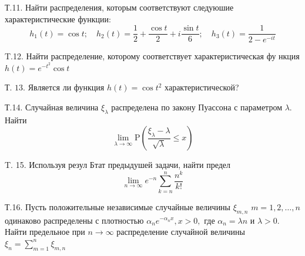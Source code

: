 \documentclass[a4paper,12pt]{article} %
\begin{document}
\begin{example}

Т.11. Найти распределения, которым соответствуют следуюшие характеристические функции:
$$
h_{1}(t)=\cos t ; \quad h_{2}(t)=\frac{1}{2}+\frac{\cos t}{2}+i \frac{\sin t}{6} ; \quad h_{3}(t)=\frac{1}{2-e^{-i t}}
$$




\end{example}





\begin{example}


T.12. Найти распределение, которому соответствует характеристическая фу нкция $h(t)=e^{-t^{2}} \cos t$



\end{example}







\begin{example}

Т. $13 .$ Является ли функция $h(t)=\cos t^{2}$ характеристической?




\end{example}



\begin{example}

Т.14. Случайная величина $\xi_{\lambda}$ распределена по закону Пуассона с параметром $\lambda .$ Найти
$$
\lim _{\lambda \rightarrow \infty} \mathrm{P}\left(\frac{\xi_{\lambda}-\lambda}{\sqrt{\lambda}} \leqslant x\right)
$$




\end{example}



\begin{example}

T. 15. Используя резул Бтат предыдушей задачи, найти предел
$$
\lim _{n \rightarrow \infty} e^{-n} \sum_{k=n}^{n} \frac{n^{k}}{k !}
$$




\end{example}





\begin{example}

Т.16. Пусть положительные независимые случайные величины $\xi_{m, n}$ $m=1,2, \ldots, n$ одинаково распределены с плотностью $\alpha_{n} e^{-\alpha_{n} x}, x>0,$ где $\alpha_{n}=\lambda n$ и $\lambda>0 .$ Найти предельное при $n \rightarrow \infty$ распределение случайной величины $\xi_{n}=\sum_{m=1}^{n} \xi_{m, n}$




\end{example}
\end{document}
